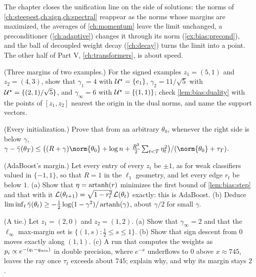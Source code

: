 \begin{refsection}
The chapter closes the unification line on the side of solutions: the norms of \cref{ch:steepest,ch:sign,ch:spectral} reappear as the norms whose margins are maximized, the averages of \cref{ch:momentum} leave the limit unchanged, a preconditioner (\cref{ch:adaptive}) changes it through its norm (\cref{ex:bias:precond}), and the ball of decoupled weight decay (\cref{ch:decay}) turns the limit into a point. The other half of Part V, \cref{ch:transformers}, is about speed.

\begin{exercises}
\item \consolidation (Three margins of two examples.) For the signed examples $z_1=(5,1)$ and $z_2=(4,3)$, show that $\gamma_1=4$ with $\mathcal{U}^\star=\{e_1\}$, $\gamma_2=11/\sqrt5$ with $\mathcal{U}^\star=\{(2,1)/\sqrt5\}$, and $\gamma_\infty=6$ with $\mathcal{U}^\star=\{(1,1)\}$; check \cref{lem:bias:duality} with the points of $[z_1,z_2]$ nearest the origin in the dual norms, and name the support vectors.\label{ex:bias:twopoints}

\item \consolidation (Every initialization.) Prove that from an arbitrary $\theta_0$, whenever the right side is below $\gamma$,
$\gamma-\biasbar(\theta_T)\le\bigl((R+\gamma)\norm{\theta_0}+\log n+\frac{R^2}2\sum_{t<T}\eta_t^2\bigr)/(\norm{\theta_0}+\tau_T)$. \label{ex:bias:init}

\item \consolidation\hard (AdaBoost's margin.) Let every entry of every $z_i$ be $\pm1$, as for weak classifiers valued in $\{-1,1\}$, so that $R=1$ in the $\ell_1$ geometry, and let every edge $r_t$ be below $1$. (a) Show that $\eta=\operatorname{artanh}(r)$ minimizes the first bound of \cref{lem:bias:step} and that with it $\mathcal{L}(\theta_{t+1})=\sqrt{1-r_t^2}\,\mathcal{L}(\theta_t)$ exactly: this is AdaBoost. (b) Deduce $\liminf_t\bar\gamma(\theta_t)\ge-\frac12\log(1-\gamma^2)/\operatorname{artanh}(\gamma)$, about $\gamma/2$ for small $\gamma$. \label{ex:bias:adaboost}

\item \consolidation (A tie.) Let $z_1=(2,0)$ and $z_2=(1,2)$. (a) Show that $\gamma_\infty=2$ and that the $\ell_\infty$ max-margin set is $\{(1,s):\frac12\le s\le1\}$. (b) Show that sign descent from $0$ moves exactly along $(1,1)$. (c) A run that computes the weights as $p_i\propto e^{-(q_i-q_{\min})}$ in double precision, where $e^{-x}$ underflows to $0$ above $x\approx745$, leaves the ray once $\tau_t$ exceeds about $745$; explain why, and why its margin stays $2$.\label{ex:bias:tie}


\end{exercises}
\end{refsection}
